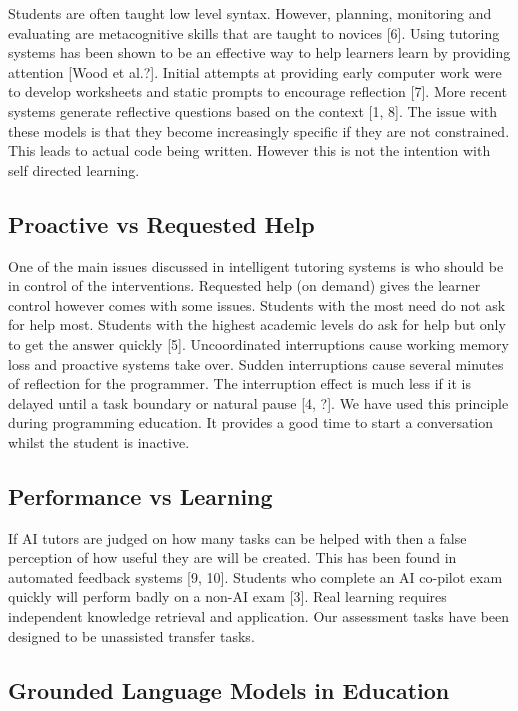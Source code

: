 \documentclass[conference]{IEEEtran}
\begin{document}
Students are often taught low level syntax. However, planning, monitoring and evaluating are metacognitive skills that are taught to novices [6]. Using tutoring systems has been shown to be an effective way to help learners learn by providing attention [Wood et al.?]. Initial attempts at providing early computer work were to develop worksheets and static prompts to encourage reflection [7]. More recent systems generate reflective questions based on the context [1, 8]. The issue with these models is that they become increasingly specific if they are not constrained. This leads to actual code being written. However this is not the intention with self directed learning.

\subsection{Proactive vs Requested Help}

One of the main issues discussed in intelligent tutoring systems is who should be in control of the interventions. Requested help (on demand) gives the learner control however comes with some issues. Students with the most need do not ask for help most. Students with the highest academic levels do ask for help but only to get the answer quickly [5]. Uncoordinated interruptions cause working memory loss and proactive systems take over. Sudden interruptions cause several minutes of reflection for the programmer. The interruption effect is much less if it is delayed until a task boundary or natural pause [4, ?]. We have used this principle during programming education. It provides a good time to start a conversation whilst the student is inactive.

\subsection{Performance vs Learning}

If AI tutors are judged on how many tasks can be helped with then a false perception of how useful they are will be created. This has been found in automated feedback systems [9, 10]. Students who complete an AI co-pilot exam quickly will perform badly on a non-AI exam [3]. Real learning requires independent knowledge retrieval and application. Our assessment tasks have been designed to be unassisted transfer tasks.

\subsection{Grounded Language Models in Education}
\end{document}
